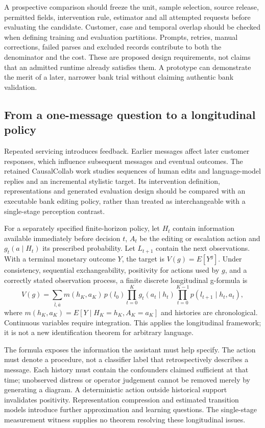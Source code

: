 A prospective comparison should freeze the unit, sample selection, source release, permitted fields, intervention rule, estimator and all attempted requests before evaluating the candidate. Customer, case and temporal overlap should be checked when defining training and evaluation partitions. Prompts, retries, manual corrections, failed parses and excluded records contribute to both the denominator and the cost. These are proposed design requirements, not claims that an admitted runtime already satisfies them. A prototype can demonstrate the merit of a later, narrower bank trial without claiming authentic bank validation.

\subsection{From a one-message question to a longitudinal policy}

Repeated servicing introduces feedback. Earlier messages affect later customer responses, which influence subsequent messages and eventual outcomes. The retained CausalCollab work studies sequences of human edits and language-model replies and an incremental stylistic target. Its intervention definition, representations and generated evaluation design should be compared with an executable bank editing policy, rather than treated as interchangeable with a single-stage perception contrast.~\citep{exec13_census_collaboration}

For a separately specified finite-horizon policy, let $H_t$ contain information available immediately before decision $t$, $A_t$ be the editing or escalation action and $g_t(a\mid H_t)$ its prescribed probability. Let $L_{t+1}$ contain the next observations. With a terminal monetary outcome $Y$, the target is $V(g)=E[Y^g]$. Under consistency, sequential exchangeability, positivity for actions used by $g$, and a correctly stated observation process, a finite discrete longitudinal g-formula is
\begin{equation}
 V(g)=\sum_{\bar l,\bar a}m(h_K,a_K)\,p(l_0)
 \prod_{t=0}^{K}g_t(a_t\mid h_t)
 \prod_{t=0}^{K-1}p(l_{t+1}\mid h_t,a_t),
 \label{eq:exec28-lm-policy}
\end{equation}
where $m(h_K,a_K)=E[Y\mid H_K=h_K,A_K=a_K]$ and histories are chronological. Continuous variables require integration. This applies the longitudinal framework; it is not a new identification theorem for arbitrary language.~\citep{hernan2020}

The formula exposes the information the assistant must help specify. The action must denote a procedure, not a classifier label that retrospectively describes a message. Each history must contain the confounders claimed sufficient at that time; unobserved distress or operator judgement cannot be removed merely by generating a diagram. A deterministic action outside historical support invalidates positivity. Representation compression and estimated transition models introduce further approximation and learning questions. The single-stage measurement witness supplies no theorem resolving these longitudinal issues.

